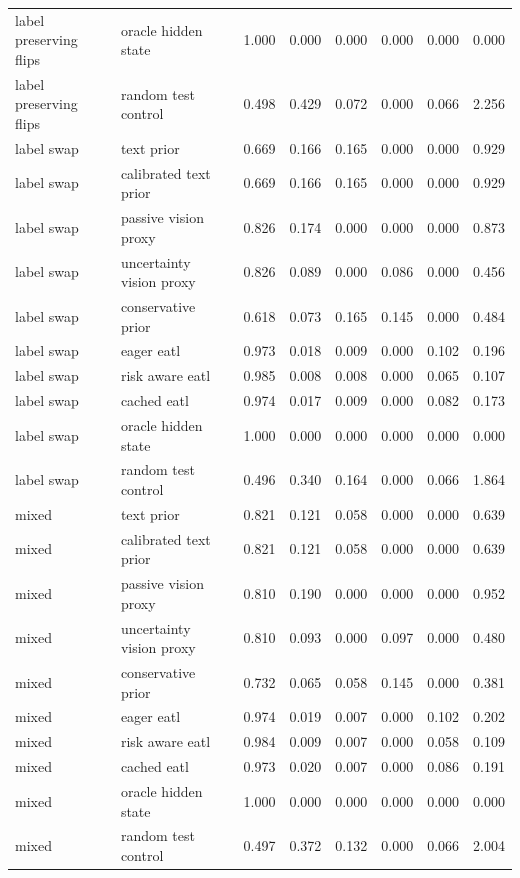 \begin{longtable}{llrrrrrr}
label preserving flips & oracle hidden state & 1.000 & 0.000 & 0.000 & 0.000 & 0.000 & 0.000 \\
label preserving flips & random test control & 0.498 & 0.429 & 0.072 & 0.000 & 0.066 & 2.256 \\
\midrule
label swap & text prior & 0.669 & 0.166 & 0.165 & 0.000 & 0.000 & 0.929 \\
label swap & calibrated text prior & 0.669 & 0.166 & 0.165 & 0.000 & 0.000 & 0.929 \\
label swap & passive vision proxy & 0.826 & 0.174 & 0.000 & 0.000 & 0.000 & 0.873 \\
label swap & uncertainty vision proxy & 0.826 & 0.089 & 0.000 & 0.086 & 0.000 & 0.456 \\
label swap & conservative prior & 0.618 & 0.073 & 0.165 & 0.145 & 0.000 & 0.484 \\
label swap & eager eatl & 0.973 & 0.018 & 0.009 & 0.000 & 0.102 & 0.196 \\
label swap & risk aware eatl & 0.985 & 0.008 & 0.008 & 0.000 & 0.065 & 0.107 \\
label swap & cached eatl & 0.974 & 0.017 & 0.009 & 0.000 & 0.082 & 0.173 \\
label swap & oracle hidden state & 1.000 & 0.000 & 0.000 & 0.000 & 0.000 & 0.000 \\
label swap & random test control & 0.496 & 0.340 & 0.164 & 0.000 & 0.066 & 1.864 \\
\midrule
mixed & text prior & 0.821 & 0.121 & 0.058 & 0.000 & 0.000 & 0.639 \\
mixed & calibrated text prior & 0.821 & 0.121 & 0.058 & 0.000 & 0.000 & 0.639 \\
mixed & passive vision proxy & 0.810 & 0.190 & 0.000 & 0.000 & 0.000 & 0.952 \\
mixed & uncertainty vision proxy & 0.810 & 0.093 & 0.000 & 0.097 & 0.000 & 0.480 \\
mixed & conservative prior & 0.732 & 0.065 & 0.058 & 0.145 & 0.000 & 0.381 \\
mixed & eager eatl & 0.974 & 0.019 & 0.007 & 0.000 & 0.102 & 0.202 \\
mixed & risk aware eatl & 0.984 & 0.009 & 0.007 & 0.000 & 0.058 & 0.109 \\
mixed & cached eatl & 0.973 & 0.020 & 0.007 & 0.000 & 0.086 & 0.191 \\
mixed & oracle hidden state & 1.000 & 0.000 & 0.000 & 0.000 & 0.000 & 0.000 \\
mixed & random test control & 0.497 & 0.372 & 0.132 & 0.000 & 0.066 & 2.004 \\

\end{longtable}

